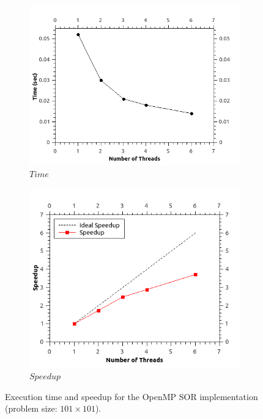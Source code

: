 \documentclass[11pt]{report}
\begin{document}
\begin{figure}[th!]
\centering
\begin{subfigure}{0.45\textwidth}
  \centering
  \includegraphics[width=1.0\linewidth]{images/sor_time_101}
  \caption{$Time$}
\end{subfigure}
\begin{subfigure}{0.45\textwidth}
  \centering
  \includegraphics[width=1.0\linewidth]{images/sor_speedup_101}
  \caption{$Speedup$}
\end{subfigure}
\caption{Execution time and speedup for the OpenMP SOR implementation (problem size: $101 \times 101$). }
\label{fig:example5.7}
\end{figure}
\end{document}
